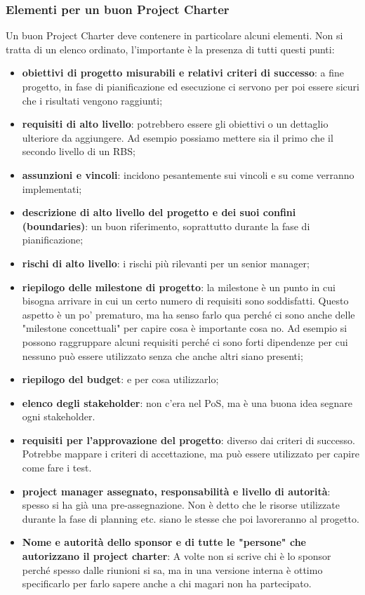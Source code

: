 \subsubsection{Elementi per un buon Project Charter}
Un buon Project Charter deve contenere in particolare alcuni elementi. Non si tratta di un elenco ordinato, l'importante è la presenza di tutti questi punti:
\begin{itemize}
	\item \textbf{obiettivi di progetto misurabili e relativi criteri di successo}: a fine progetto, in fase di pianificazione ed esecuzione ci servono per poi essere sicuri che i risultati vengono raggiunti;
	\item \textbf{requisiti di alto livello}: potrebbero essere gli obiettivi o un dettaglio ulteriore da aggiungere. Ad esempio possiamo mettere sia il primo che il secondo livello di un RBS;
	\item \textbf{assunzioni e vincoli}: incidono pesantemente sui vincoli e su come verranno implementati;
	\item \textbf{descrizione di alto livello del progetto e dei suoi confini (boundaries)}: un buon riferimento, soprattutto durante la fase di pianificazione;
	\item \textbf{rischi di alto livello}: i rischi più rilevanti per un senior manager;
	\item \textbf{riepilogo delle milestone di progetto}: la milestone è un punto in cui bisogna arrivare in cui un certo numero di requisiti sono soddisfatti. Questo aspetto è un po' prematuro, ma ha senso farlo qua perché ci sono anche delle "milestone concettuali" per capire cosa è importante cosa no. Ad esempio si possono raggruppare alcuni requisiti perché ci sono forti dipendenze per cui nessuno può essere utilizzato senza che anche altri siano presenti;
	\item \textbf{riepilogo del budget}: e per cosa utilizzarlo;
	\item \textbf{elenco degli stakeholder}: non c'era nel PoS, ma è una buona idea segnare ogni stakeholder.
	\item \textbf{requisiti per l'approvazione del progetto}: diverso dai criteri di successo. Potrebbe mappare i criteri di accettazione, ma può essere utilizzato per capire come fare i test.
	\item \textbf{project manager assegnato, responsabilità e livello di autorità}: spesso si ha già una pre-assegnazione. Non è detto che le risorse utilizzate durante la fase di planning etc. siano le stesse che poi lavoreranno al progetto.
	\item \textbf{Nome e autorità dello sponsor e di tutte le "persone" che autorizzano il project charter}: A volte non si scrive chi è lo sponsor perché spesso dalle riunioni si sa, ma in una versione interna è ottimo specificarlo per farlo sapere anche a chi magari non ha partecipato.
\end{itemize}
